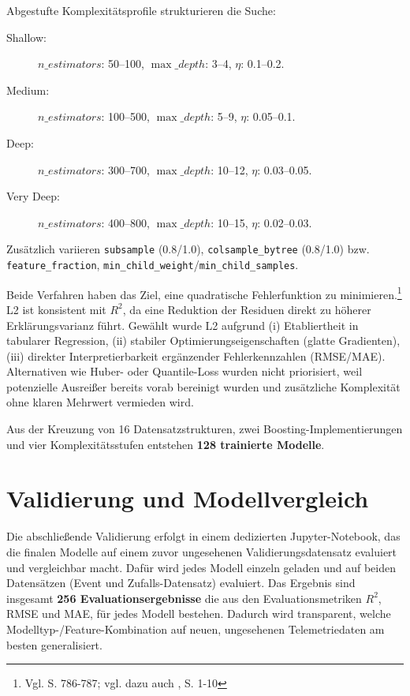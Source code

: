 Abgestufte Komplexitätsprofile strukturieren die Suche:
\begin{description}
  \item[Shallow:] $n\_estimators$: 50–100, $\max\_depth$: 3–4, $\eta$: 0.1–0.2.
  \item[Medium:] $n\_estimators$: 100–500, $\max\_depth$: 5–9, $\eta$: 0.05–0.1.
  \item[Deep:] $n\_estimators$: 300–700, $\max\_depth$: 10–12, $\eta$: 0.03–0.05.
  \item[Very Deep:] $n\_estimators$: 400–800, $\max\_depth$: 10–15, $\eta$: 0.02–0.03.
\end{description}
Zusätzlich variieren \texttt{subsample} (0.8/1.0), \texttt{colsample\_bytree} (0.8/1.0) bzw. \texttt{feature\_fraction}, \texttt{min\_child\_weight}/\texttt{min\_child\_samples}.

Beide Verfahren haben das Ziel, eine quadratische Fehlerfunktion zu minimieren.\footnote{Vgl. \cite{Chen2016} S. 786-787; vgl. dazu auch \cite{Ke2017}, S. 1-10} L2 ist konsistent mit $R^2$, da eine Reduktion der Residuen direkt zu höherer Erklärungsvarianz führt. Gewählt wurde L2 aufgrund (i) Etabliertheit in tabularer Regression, (ii) stabiler Optimierungseigenschaften (glatte Gradienten), (iii) direkter Interpretierbarkeit ergänzender Fehlerkennzahlen (RMSE/MAE). Alternativen wie Huber- oder Quantile-Loss wurden nicht priorisiert, weil potenzielle Ausreißer bereits vorab bereinigt wurden und zusätzliche Komplexität ohne klaren Mehrwert vermieden wird.

Aus der Kreuzung von 16 Datensatzstrukturen, zwei Boosting-Implementierungen und vier Komplexitätsstufen entstehen \textbf{128 trainierte Modelle}.







\section{Validierung und Modellvergleich}
\label{sec:validierung_modellvergleich}

Die abschließende Validierung erfolgt in einem dedizierten Jupyter-Notebook, das die finalen Modelle auf einem zuvor ungesehenen Validierungsdatensatz evaluiert und vergleichbar macht.
Dafür wird jedes Modell einzeln geladen und auf beiden Datensätzen (Event und Zufalls-Datensatz) evaluiert. Das Ergebnis sind insgesamt \textbf{256 Evaluationsergebnisse} die aus den Evaluationsmetriken $R^2$, RMSE und MAE, für jedes Modell bestehen.
\noindent
Dadurch wird transparent, welche Modelltyp-/Feature-Kombination auf neuen, ungesehenen Telemetriedaten am besten generalisiert. 
